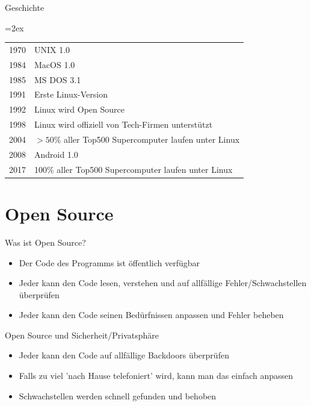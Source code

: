 \documentclass[10pt]{beamer}
\begin{document}
\begin{frame}{Geschichte}
	\centering
	{\tablinesep=2ex\tabcolsep=10pt
		\begin{table}
			\begin{tabular}{r l}
				\toprule
				1970 & UNIX 1.0 \\
				1984 & MacOS 1.0 \\
				1985 & MS DOS 3.1 \\
				1991 & Erste Linux-Version \\
				1992 & Linux wird Open Source \\
				1998 & Linux wird offiziell von Tech-Firmen unterstützt \\
				2004 & $>50\%$ aller Top500 Supercomputer laufen unter Linux \\
				2008 & Android 1.0 \\
				2017 & 100\% aller Top500 Supercomputer laufen unter Linux \\
				\bottomrule
			\end{tabular}
		\end{table}
	}
\end{frame}

\section{Open Source}

\begin{frame}{Was ist Open Source?}
	\begin{itemize}[<+- | alert@+>]
		\item Der Code des Programms ist öffentlich verfügbar
		\item Jeder kann den Code lesen, verstehen und auf allfällige Fehler/Schwachstellen überprüfen
		\item Jeder kann den Code seinen Bedürfnissen anpassen und Fehler beheben
	\end{itemize}
\end{frame}

\begin{frame}{Open Source und Sicherheit/Privatsphäre}
	\begin{itemize}[<+- | alert@+>]
		\item Jeder kann den Code auf allfällige Backdoors überprüfen
		\item Falls zu viel 'nach Hause telefoniert' wird, kann man das einfach anpassen
		\item Schwachstellen werden schnell gefunden und behoben
	\end{itemize}
\end{frame}
\end{document}

